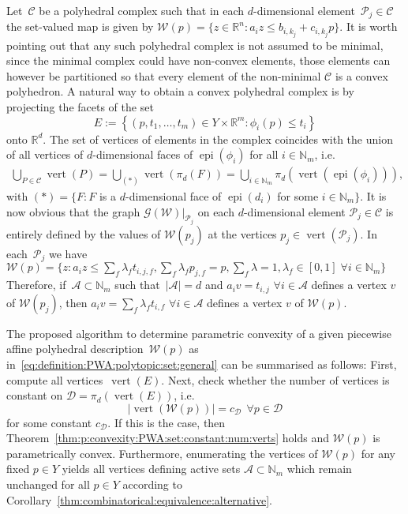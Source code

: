 \documentclass[smallextended]{svjour3}       %
\numberwithin{equation}{section}
\providecommand{\abs}[1]{\left|#1\right|}
\DeclareMathOperator{\vertices}{vert}
\DeclareMathOperator{\epi}{epi}
\begin{document}
Let~$\mathcal C$ be a polyhedral complex such that in each $d$-dimensional element~$\mathcal P_j\in\mathcal C$ the set-valued map is given by $\mathcal W(p) = \{z\in\mathbb R^n:a_i z\leq b_{i,k_j} + c_{i,k_j} p\}$. 
%
It is worth pointing out that any such polyhedral complex is not assumed to be minimal, since the minimal complex could have non-convex elements, those elements can however be partitioned so that every element of the non-minimal $\mathcal C$ is a convex polyhedron. 
%
A natural way to obtain a convex polyhedral complex is by projecting the facets of the set
%
\[%
  E :=\left\{(p,t_1,\dots,t_m)\in Y\times\mathbb R^{m}:\phi_i(p)\leq t_i\right\}
\]%
%
onto $\mathbb R^d$.
%
The set of vertices of elements in the complex coincides with the union of all vertices of $d$-dimensional faces of $\epi(\phi_i)$ for all $i\in\mathbb N_m$, i.e.
%
$$\begin{aligned}
	\bigcup_{{P}\in\mathcal C}\vertices({P}) = \bigcup_{(\ast)} \vertices(\pi_d(F)) = \bigcup_{i\in\mathbb N_m}\pi_d(\vertices(\epi(\phi_i))),
\end{aligned}$$
%
with $(\ast) = \{F: F $ is a $d$-dimensional face of $\epi(d_i)$ for some $i\in\mathbb N_m\}$.
%
It is now obvious that the graph $\mathscr G(\mathcal W)\vert_{\mathcal P_j}$ on each $d$-dimensional element $\mathcal P_j\in\mathcal C$ is entirely defined by the values of $\mathcal W(p_j)$ at the vertices $p_j\in\vertices(\mathcal P_j)$.
%
In each~$\mathcal P_j$ we have $\mathcal W(p) = \{z: a_i z\leq \sum_f \lambda_f t_{i,j,f}, \sum_f\lambda_f p_{j,f}=p, \sum_f\lambda=1, \lambda_f\in[0,1]\; \forall i\in\mathbb N_m\}$
%
Therefore, if~$\mathcal A\subset\mathbb N_m$ such that~$\abs{\mathcal A}=d$ and $a_i v = t_{i,j}$ $\forall i\in\mathcal A$ defines a vertex $v$ of $\mathcal W(p_j)$, then $a_i v = \sum_f \lambda_f t_{i,f}$ $\forall i \in \mathcal A$ defines a vertex $v$ of $\mathcal W(p)$.

The proposed algorithm to determine parametric convexity of a given piecewise affine polyhedral description~$\mathcal W(p)$ as in~\eqref{eq:definition:PWA:polytopic:set:general} can be summarised as follows:
%
First, compute all vertices~$\vertices(E)$.
%
Next, check whether the number of vertices is constant on $\mathcal D = \pi_d\left(\vertices(E)\right)$, i.e. 
%
$$\abs{\vertices(\mathcal W(p))} = c_{\mathcal D} \ \ \forall p\in\mathcal D$$
%
for some constant $c_{\mathcal D}$. If this is the case, then
Theorem~\ref{thm:p:convexity:PWA:set:constant:num:verts} holds and
$\mathcal W(p)$ is parametrically convex. Furthermore, enumerating the vertices of $\mathcal W(p)$ for any fixed $p\in Y$ yields all vertices defining active sets $\mathcal A\subset\mathbb N_m$ which remain unchanged for all $p\in Y$ according to Corollary~\ref{thm:combinatorical:equivalence:alternative}.
%
\end{document}
